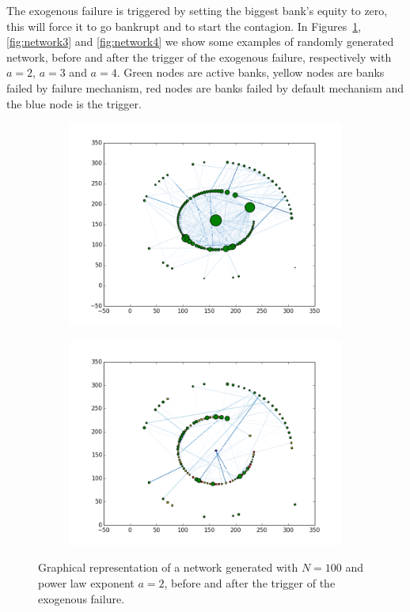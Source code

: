 \documentclass[a4paper, 11pt]{article}
\begin{document}
The exogenous failure is triggered by setting the biggest bank's equity to zero, this will force it to go bankrupt and to start the contagion. In Figures~\ref{fig:network2}, \ref{fig:network3} and \ref{fig:network4} we show some examples of randomly generated network, before and after the trigger of the exogenous failure, respectively with $a=2$, $a=3$ and $a=4$. Green nodes are active banks, yellow nodes are banks failed by failure mechanism, red nodes are banks failed by default mechanism and the blue node is the trigger.

\begin{figure}[htbp]
    \centering
    \begin{subfigure}[b]{0.9\textwidth}
		\includegraphics[width=\textwidth]{images/network2.png}
	\end{subfigure}
    \begin{subfigure}[b]{0.9\textwidth}
		\includegraphics[width=\textwidth]{images/contagion2.png}
	\end{subfigure}
	\caption{Graphical representation of a network generated with $N = 100$ and power law exponent $a = 2$, before and after the trigger of the exogenous failure.}\label{fig:network2}
\end{figure}
\end{document}
